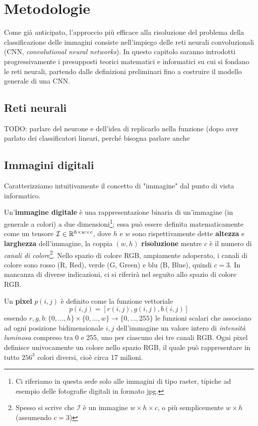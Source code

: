 \chapter{Metodologie}\label{teoria}
\pagestyle{fancy}
\fancyhf{}
\fancyhead[OL]{\rightmark}
\cfoot{\thepage}

Come già anticipato, l'approccio più efficace alla risoluzione del problema della classificazione delle immagini consiste nell'impiego delle reti neurali convoluzionali (CNN, \emph{convolutional neural networks}). In questo capitolo saranno introdotti progressivamente i presupposti teorici matematici e informatici su cui si fondano le reti neurali, partendo dalle definizioni preliminari fino a costruire il modello generale di una CNN.



\section{Reti neurali}

TODO: parlare del neurone e dell'idea di replicarlo nella funzione (dopo aver parlato dei classificatori lineari, perché bisogna parlare anche 

\section{Immagini digitali}
Caratterizziamo intuitivamente il concetto di "immagine" dal punto di vista informatico.

Un'\textbf{immagine digitale} è una rappresentazione binaria di un'immagine (in generale a colori) a due dimensioni\footnote{Ci riferiamo in questa sede solo alle immagini di tipo raster, tipiche ad esempio delle fotografie digitali in formato jpg.}; essa può essere definita matematicamente come un tensore $\mathcal{I}\in\mathbb{R}^{h\times w\times c}$, dove $h$ e $w$ sono rispettivamente dette \textbf{altezza} e \textbf{larghezza} dell'immagine, la coppia $(w,h)$ \textbf{risoluzione} mentre $c$ è il numero di \emph{canali di colore}\footnote{Spesso si scrive che $\mathcal{I}$ è un immagine $w\times h\times c$, o più semplicemente $w\times h$ (assumendo $c=3$)}. Nello spazio di colore RGB, ampiamente adoperato, i canali di colore sono rosso (R, Red), verde (G, Green) e blu (B, Blue), quindi $c=3$. In mancanza di diverse indicazioni, ci si riferirà nel seguito allo spazio di colore RGB.

Un \textbf{pixel} $p(i,j)$ è definito come la funzione vettoriale
\[p(i,j)=[r(i,j),g(i,j),b(i,j)]\]
essendo $r,g,b:\{0,\dots,h\}\times\{0,\dots,w\}\to\{0,\dots,255\}$ le funzioni scalari che associano ad ogni posizione bidimensionale $i,j$ dell'immagine un valore intero di \emph{intensità luminosa} compreso tra 0 e 255, uno per ciascuno dei tre canali RGB. Ogni pixel definisce univocamente un colore nello spazio RGB, il quale può rappresentare in tutto $256^{3}$ colori diversi, cioè circa 17 milioni.

